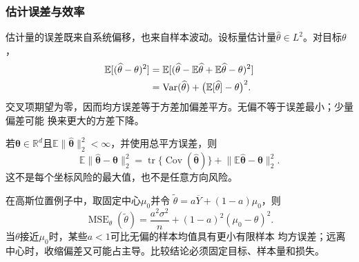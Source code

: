 \subsubsection{估计误差与效率}
\label{sec:statistics-bias-efficiency}
估计量的误差既来自系统偏移，也来自样本波动。设标量估计量\(\widehat\theta\in L^2\)。对目标\(\theta\)，
\begin{align}
  \mathbb{E}[(\widehat\theta-\theta)^2]
  &=
  \mathbb{E}[(\widehat\theta-\mathbb{E}\widehat\theta
  +\mathbb{E}\widehat\theta-\theta)^2] \notag\\
  &=
  \operatorname{Var}(\widehat\theta)
  +\bigl(\mathbb{E}[\widehat\theta]-\theta\bigr)^2.
  \label{eq:statistics-mse-decomposition}
\end{align}
交叉项期望为零，因而均方误差等于方差加偏差平方。无偏不等于误差最小；少量偏差可能
换来更大的方差下降。

若\(\bm\theta\in\mathbb{R}^d\)且\(\mathbb E\lVert\widehat{\bm\theta}\rVert_2^2<\infty\)，并使用总平方误差，则
\[
  \mathbb{E}\lVert\widehat{\bm\theta}-\bm\theta\rVert_2^2
  =\operatorname{tr}\{\operatorname{Cov}(\widehat{\bm\theta})\}
   +\lVert\mathbb{E}\widehat{\bm\theta}-\bm\theta\rVert_2^2.
\]
这不是每个坐标风险的最大值，也不是任意方向风险。

在高斯位置例子中，取固定中心\(\mu_0\)并令
\(\widetilde\theta=a\overline Y+(1-a)\mu_0\)，则
\[
  \operatorname{MSE}_\theta(\widetilde\theta)
  =\frac{a^2\sigma^2}{n}+(1-a)^2(\mu_0-\theta)^2.
\]
当\(\theta\)接近\(\mu_0\)时，某些\(a<1\)可比无偏的样本均值具有更小有限样本
均方误差；远离中心时，收缩偏差又可能占主导。比较结论必须固定目标、样本量和损失。

